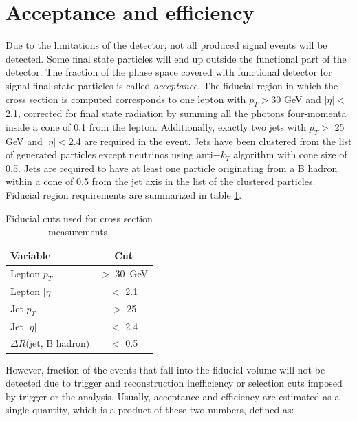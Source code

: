 \section{Acceptance and efficiency}
\label{sec:AE}
    
Due to the limitations of the detector, not all produced signal events will be detected. Some final state particles will end up outside the functional part of the detector. The fraction of the phase space covered with functional detector for signal final state particles is called \textit{acceptance}. The fiducial region in which the cross section is computed corresponds to one lepton with $p_T>$30 GeV and $|\eta|<$2.1, corrected for final state radiation by summing all the photons four-momenta inside a cone of 0.1 from the lepton. Additionally, exactly two jets with $p_T>$ 25 GeV and $|\eta|<$2.4 are required in the event. Jets have been clustered from the list of generated particles except neutrinos using anti$-k_T$ algorithm with cone size of 0.5. Jets are required to have at least one particle originating from a B hadron within a cone of 0.5 from the jet axis in the list of the clustered particles. Fiducial region requirements are summarized in table \ref{tab:fiducial}.             
\begin{table}[!htb]
\begin{center}
   \begin{tabular} {l c} \hline \hline
        Variable         & Cut \\
        \hline
        Lepton $p_T$    & $>$ 30\ GeV \\
        Lepton $|\eta|$   & $<$ 2.1 \\
        Jet $p_T$       & $>$ 25  \\
        Jet $|\eta|$      & $<$ 2.4 \\
        $\Delta R$(jet, B hadron) & $<$ 0.5 \\
        \hline\hline
   \end{tabular}
\caption{Fiducial cuts used for cross section measurements.}
\label{tab:fiducial}
\end{center}
\end{table}
However, fraction of the events that fall into the fiducial volume will not be detected due to trigger and reconstruction inefficiency or selection cuts imposed by trigger or the analysis. Usually, acceptance and efficiency are estimated as a single quantity, which is a product of these two numbers, defined as:
